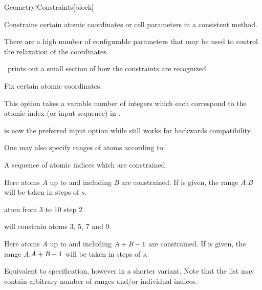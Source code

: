 \begin{fdfentry}{Geometry!Constraints}[block]

  Constrains certain atomic coordinates or cell parameters in a
  consistent method.

  There are a high number of configurable parameters that may be used
  to control the relaxation of the coordinates.

  \note \siesta\ prints out a small section of how the constraints are
  recognized. 

  \begin{fdfoptions}
    Fix certain atomic coordinates. 

    This option takes a variable number of integers which each
    correspond to the atomic index (or input sequence) in
    .

     is now the preferred input option while
     still works for backwards compatibility.

    One may also specify ranges of atoms according to:

    \begin{fdfoptions}
      A sequence of atomic indices which are constrained. 

      Here atoms \emph{A} up to and including \emph{B} are
      constrained.
      If  is given, the range
      \emph{A}:\emph{B} will be taken in steps of \emph{s}.

      \begin{fdfexample}
        atom from 3 to 10 step 2
      \end{fdfexample}
      will constrain atoms 3, 5, 7 and 9.

      Here atoms \emph{A} up to and including $\emph{A}+\emph{B}-1$
      are constrained.  
      If  is given, the range
      \emph{A}:$\emph{A}+\emph{B}-1$ will be taken in steps of
      \emph{s}.

      Equivalent to  specification, however in a
      shorter variant. Note that the list may contain arbitrary number
      of ranges and/or individual indices.


\end{fdfoptions}
\end{fdfoptions}
\end{fdfentry}
